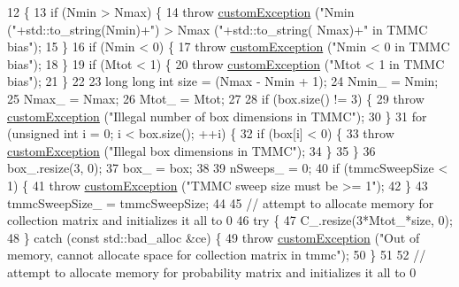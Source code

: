 \begin{DoxyCode}
12                                                                                                            
                       \{
13     \textcolor{keywordflow}{if} (Nmin > Nmax) \{
14         \textcolor{keywordflow}{throw} \hyperlink{classcustom_exception}{customException} (\textcolor{stringliteral}{"Nmin ("}+std::to\_string(Nmin)+\textcolor{stringliteral}{") > Nmax ("}+std::to\_string(
      Nmax)+\textcolor{stringliteral}{" in TMMC bias"});
15     \}
16     \textcolor{keywordflow}{if} (Nmin < 0) \{
17         \textcolor{keywordflow}{throw} \hyperlink{classcustom_exception}{customException} (\textcolor{stringliteral}{"Nmin < 0 in TMMC bias"});
18     \}
19     \textcolor{keywordflow}{if} (Mtot < 1) \{
20         \textcolor{keywordflow}{throw} \hyperlink{classcustom_exception}{customException} (\textcolor{stringliteral}{"Mtot < 1 in TMMC bias"});
21     \}
22 
23     \textcolor{keywordtype}{long} \textcolor{keywordtype}{long} \textcolor{keywordtype}{int} size = (Nmax - Nmin + 1);
24     Nmin\_ = Nmin;
25     Nmax\_ = Nmax;
26     Mtot\_ = Mtot;
27 
28     \textcolor{keywordflow}{if} (box.size() != 3) \{
29         \textcolor{keywordflow}{throw} \hyperlink{classcustom_exception}{customException} (\textcolor{stringliteral}{"Illegal number of box dimensions in TMMC"});
30     \}
31     \textcolor{keywordflow}{for} (\textcolor{keywordtype}{unsigned} \textcolor{keywordtype}{int} i = 0; i < box.size(); ++i) \{
32         \textcolor{keywordflow}{if} (box[i] < 0) \{
33             \textcolor{keywordflow}{throw} \hyperlink{classcustom_exception}{customException} (\textcolor{stringliteral}{"Illegal box dimensions in TMMC"});
34         \}
35     \}
36     box\_.resize(3, 0);
37     box\_ = box;
38 
39     nSweeps\_ = 0;
40     \textcolor{keywordflow}{if} (tmmcSweepSize < 1) \{
41         \textcolor{keywordflow}{throw} \hyperlink{classcustom_exception}{customException} (\textcolor{stringliteral}{"TMMC sweep size must be >= 1"});
42     \}
43     tmmcSweepSize\_ = tmmcSweepSize;
44 
45     \textcolor{comment}{// attempt to allocate memory for collection matrix and initializes it all to 0}
46     \textcolor{keywordflow}{try} \{
47         C\_.resize(3*Mtot\_*size, 0);
48     \} \textcolor{keywordflow}{catch} (\textcolor{keyword}{const} std::bad\_alloc &ce) \{
49         \textcolor{keywordflow}{throw} \hyperlink{classcustom_exception}{customException} (\textcolor{stringliteral}{"Out of memory, cannot allocate space for collection matrix
       in tmmc"});
50     \}
51 
52     \textcolor{comment}{// attempt to allocate memory for probability matrix and initializes it all to 0}

\end{DoxyCode}
